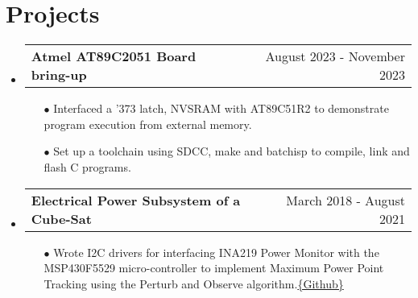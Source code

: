 \documentclass[a4,11pt]{article}
\makeatletter
\newcommand{\resumeSubheadingP}[2]{
  \vspace{-2pt}\item
    \begin{tabular*}{1.0\textwidth}[t]{l@{\extracolsep{\fill}}r}
       \textbf{{\large #1}} &  {#2} \\
    \end{tabular*}\vspace{-1pt}
}
\newcommand{\resumeSubHeadingListStart}{\begin{itemize}[leftmargin=0.0in, label={}]}
\newcommand{\resumeSubHeadingListEnd}{\end{itemize}}
\makeatother
\begin{document}
\section{Projects}
  \resumeSubHeadingListStart
    \resumeSubheadingP
    {Atmel AT89C2051 Board bring-up}{August 2023 - November 2023}
    \begin{itemize}\setlength{\itemsep}{0pt}\setlength{\parskip}{0pt}\vspace{-0.2cm}
            \item[$\bullet$] Interfaced a '373 latch, NVSRAM with AT89C51R2 to demonstrate program execution from external memory.
            \item[$\bullet$] Set up a toolchain using SDCC, make and batchisp to compile, link and flash C programs.      
        \end{itemize}
    \resumeSubheadingP
    {Electrical Power Subsystem of a Cube-Sat}{March 2018 - August 2021}
    \begin{itemize}\setlength{\itemsep}{0pt}\setlength{\parskip}{0pt}\vspace{-0.2cm}
            \item[$\bullet$] Wrote I2C drivers for interfacing INA219 Power Monitor with the MSP430F5529 micro-controller to implement Maximum Power Point Tracking using the Perturb and Observe algorithm.{\href{https://github.com/parthkharade/MSP430F5529}{\{Github\}}}
        \end{itemize}
    \resumeSubHeadingListEnd
\vspace{-16pt}
\end{document}
